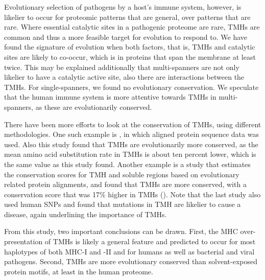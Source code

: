 
Evolutionary selection of pathogens by a host's immune system,
however, is likelier to occur for proteomic patterns that are general,
over patterns that are rare.
Where essential catalytic sites in a pathogenic proteome
are rare, TMHs are common and thus a more feasible 
target for evolution to respond to.
We have found the signature of evolution when both factors,
that is, TMHs and catalytic sites are likely to co-occur,
which is in proteins that span the membrane at least twice.
This may be explained additionally that multi-spanners
are not only likelier to have a catalytic active site,
also there are interactions between the TMHs.
For single-spanners, we found no evolutionary conservation.
We speculate that the human immune system is more attentive 
towards TMHs in multi-spanners, as these are evolutionarily conserved.

There have been more efforts to look at the conservation of TMHs,
using different methodologies.
One such example is \cite{stevens2001substitution}, 
in which aligned protein sequence data was used.
Also this study found that TMHs are evolutionarily more conserved,
as the mean amino acid substitution rate in TMHs is about ten
percent lower,
which is the same value as this study found.
Another example is a study that estimates the conservation
scores for TMH and soluble regions based on 
evolutionary related protein alignments,
and found that TMHs are more conserved, 
with a conservation score that was 17\% higher in 
TMHs (\cite{oberai2009structural}).
Note that the last study also used human SNPs
and found that mutations in TMH are likelier to cause
a disease, again underlining the importance of TMHs.


From this study, two important conclusions can be drawn. 
First, the MHC over-presentation of TMHs is likely a general feature 
and predicted to occur for most haplotypes of both MHC-I and -II 
and for humans as well as bacterial and viral pathogens. 
Second, TMHs are more evolutionary conserved than solvent-exposed protein motifs, 
at least in the human proteome. 

